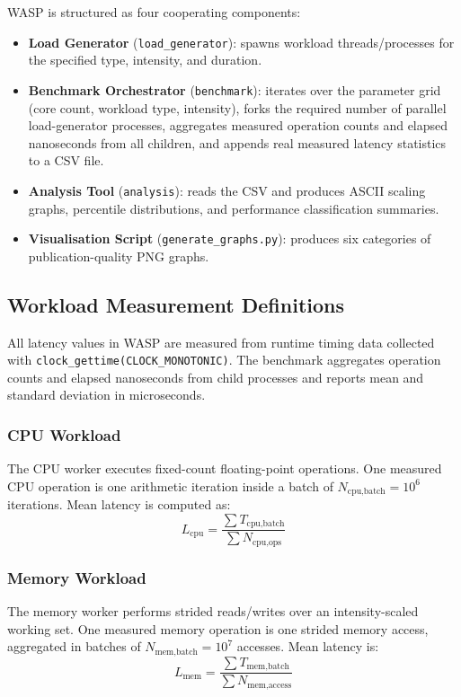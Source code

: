 \documentclass[conference]{IEEEtran}
\begin{document}
WASP is structured as four cooperating components:
\begin{itemize}
  \item \textbf{Load Generator} (\texttt{load\_generator}): spawns workload
        threads/processes for the specified type, intensity, and duration.
  \item \textbf{Benchmark Orchestrator} (\texttt{benchmark}): iterates over
        the parameter grid (core count, workload type, intensity), forks the
        required number of parallel load-generator processes, aggregates
        measured operation counts and elapsed nanoseconds from all children,
        and appends real measured latency statistics to a CSV file.
  \item \textbf{Analysis Tool} (\texttt{analysis}): reads the CSV and
        produces ASCII scaling graphs, percentile distributions, and
        performance classification summaries.
  \item \textbf{Visualisation Script} (\texttt{generate\_graphs.py}):
        produces six categories of publication-quality PNG graphs.
\end{itemize}

\subsection{Workload Measurement Definitions}

All latency values in WASP are measured from runtime timing data collected with
\texttt{clock\_gettime(CLOCK\_MONOTONIC)}.  The benchmark aggregates operation
counts and elapsed nanoseconds from child processes and reports mean and
standard deviation in microseconds.

\subsubsection{CPU Workload}
The CPU worker executes fixed-count floating-point operations.  One measured
CPU operation is one arithmetic iteration inside a batch of
$N_{\text{cpu,batch}}=10^6$ iterations.  Mean latency is computed as:
\begin{equation}
L_{\text{cpu}} = \frac{\sum T_{\text{cpu,batch}}}{\sum N_{\text{cpu,ops}}}
\end{equation}

\subsubsection{Memory Workload}
The memory worker performs strided reads/writes over an intensity-scaled working
set.  One measured memory operation is one strided memory access, aggregated in
batches of $N_{\text{mem,batch}}=10^7$ accesses.  Mean latency is:
\begin{equation}
L_{\text{mem}} = \frac{\sum T_{\text{mem,batch}}}{\sum N_{\text{mem,access}}}
\end{equation}
\end{document}
